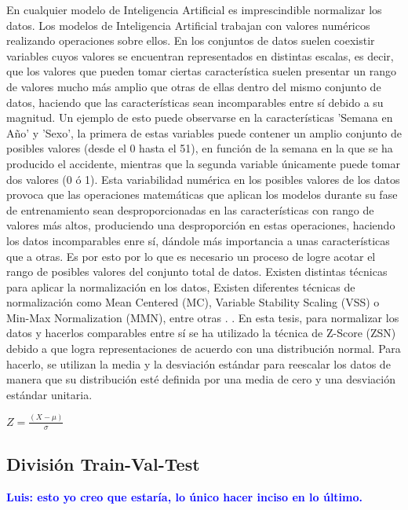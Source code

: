 \documentclass{uathesis-es}
\begin{document}
En cualquier modelo de Inteligencia Artificial es imprescindible normalizar los datos. Los modelos de Inteligencia Artificial trabajan con valores numéricos realizando operaciones sobre ellos. En los conjuntos de datos suelen coexistir variables cuyos valores se encuentran representados en distintas escalas, es decir, que los valores que pueden tomar ciertas característica suelen presentar un rango de valores mucho más amplio que otras de ellas dentro del mismo conjunto de datos, haciendo que las características sean incomparables entre sí debido a su magnitud. Un ejemplo de esto puede observarse en la características 'Semana en Año' y 'Sexo', la primera de estas variables puede contener un amplio conjunto de posibles valores (desde el 0 hasta el 51), en función de la semana en la que se ha producido el accidente, mientras que la segunda variable únicamente puede tomar dos valores (0 ó 1). Esta variabilidad numérica en los posibles valores de los datos provoca que las operaciones matemáticas que aplican los modelos durante su fase de entrenamiento sean desproporcionadas en las características con rango de valores más altos, produciendo una desproporción en estas operaciones, haciendo los datos incomparables enre sí, dándole más importancia a unas características que a otras. Es por esto por lo que es necesario un proceso de logre acotar el rango de posibles valores del conjunto total de datos. Existen distintas técnicas para aplicar la normalización en los datos, Existen diferentes técnicas de normalización como Mean Centered (MC), Variable Stability Scaling (VSS) o Min-Max Normalization (MMN), entre otras \cite{DataNormalizationInvestigation}. . En esta tesis, para normalizar los datos y hacerlos comparables entre sí se ha utilizado la técnica de Z-Score (ZSN) debido a que logra representaciones de acuerdo con una distribución normal. Para hacerlo, se utilizan la media y la desviación estándar para reescalar los datos de manera que su distribución esté definida por una media de cero y una desviación estándar unitaria.


\begin{center}
    $Z = \frac{(X - \mu)}{\sigma}$
\end{center}


\subsection{División Train-Val-Test}

\textcolor{blue}{\textbf{Luis: esto yo creo que estaría, lo único hacer inciso en lo último.}}\\
\end{document}
